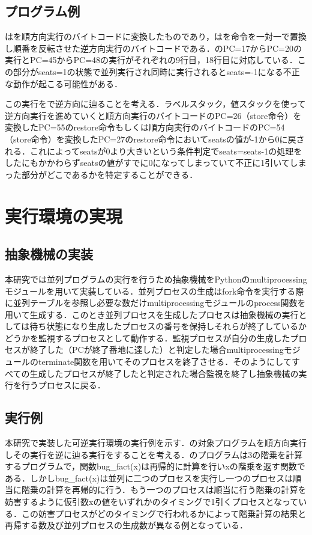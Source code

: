 \documentclass[submit,PRO]{ipsj}
\begin{document}
\subsection{プログラム例}

はを順方向実行のバイトコードに変換したものであり，はを命令を一対一で置換し順番を反転させた逆方向実行のバイトコードである．のPC=17からPC=20の実行とPC=45からPC=48の実行がそれぞれの9行目，18行目に対応している．この部分がseats=1の状態で並列実行され同時に実行されるとseats=-1になる不正な動作が起こる可能性がある．

この実行をで逆方向に辿ることを考える．ラベルスタック，値スタックを使って逆方向実行を進めていくと順方向実行のバイトコードのPC=26（store命令）を変換したPC=55のrestore命令もしくは順方向実行のバイトコードのPC=54（store命令）を変換したPC=27のrestore命令においてseatsの値が-1から0に戻される．これによってseatsが0より大きいという条件判定でseats=seats-1の処理をしたにもかかわらずseatsの値がすでに0になってしまっていて不正に1引いてしまった部分がどこであるかを特定することができる．

\section{実行環境の実現}

\subsection{抽象機械の実装}


本研究では並列プログラムの実行を行うため抽象機械をPythonのmultiprocessingモジュールを用いて実装している．並列プロセスの生成はfork命令を実行する際に並列テーブルを参照し必要な数だけmultiprocessingモジュールのprocess関数を用いて生成する．このとき並列プロセスを生成したプロセスは抽象機械の実行としては待ち状態になり生成したプロセスの番号を保持しそれらが終了しているかどうかを監視するプロセスとして動作する．監視プロセスが自分の生成したプロセスが終了した（PCが終了番地に達した）と判定した場合multiprocessingモジュールのterminate関数を用いてそのプロセスを終了させる．そのようにしてすべての生成したプロセスが終了したと判定された場合監視を終了し抽象機械の実行を行うプロセスに戻る．


\subsection{実行例}
本研究で実装した可逆実行環境の実行例を示す．の対象プログラムを順方向実行しその実行を逆に辿る実行をすることを考える．のプログラムは3の階乗を計算するプログラムで，関数bug\_fact(x)は再帰的に計算を行いxの階乗を返す関数である．しかしbug\_fact(x)は並列に二つのプロセスを実行し一つのプロセスは順当に階乗の計算を再帰的に行う．もう一つのプロセスは順当に行う階乗の計算を妨害するように仮引数xの値をいずれかのタイミングで1引くプロセスとなっている．この妨害プロセスがどのタイミングで行われるかによって階乗計算の結果と再帰する数及び並列プロセスの生成数が異なる例となっている．
\end{document}
